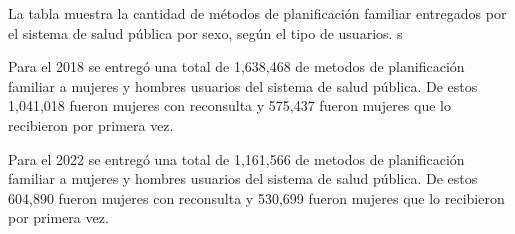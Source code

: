 La tabla muestra la cantidad de métodos de planificación familiar entregados por el sistema de salud pública por sexo, según el tipo de usuarios. s

Para el 2018 se entregó una total de 1,638,468 de metodos de planificación familiar a mujeres y hombres usuarios del sistema de salud pública. De estos 1,041,018 fueron mujeres con reconsulta y 575,437 fueron mujeres que lo recibieron por primera vez. 

Para el 2022 se entregó una total de 1,161,566 de metodos de planificación familiar a mujeres y hombres usuarios del sistema de salud pública. De estos 604,890 fueron mujeres con reconsulta y 530,699 fueron mujeres que lo recibieron por primera vez. 
